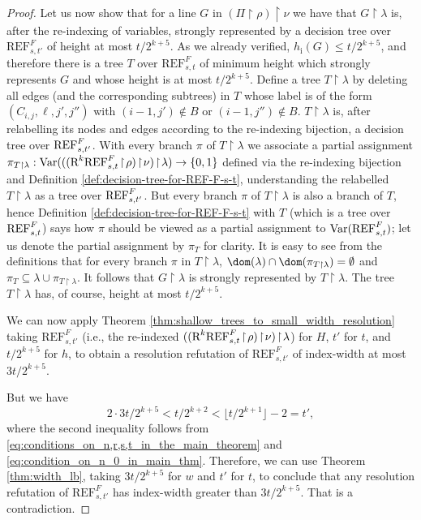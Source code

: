 \begin{proof}
Let us now show that for a line $G$ in $(\Pi \! \restriction \! \rho) \! \restriction \! \nu$ we have that $G \! \restriction \! \lambda$ is, after the re-indexing of variables, strongly represented by a decision tree over $\text{REF}^F_{s,t'}$ of height at most $t/2^{k+5}$. As we already verified, $h_{\text{i}}(G) \leq t/2^{k+5}$, and therefore there is a tree $T$ over $\text{REF}^F_{s,t}$ of minimum height which strongly represents $G$ and whose height is at most $t/2^{k+5}$. Define a tree $T \! \restriction \! \lambda$ by deleting all edges (and the corresponding subtrees) in $T$ whose label is of the form $(C_{i,j}, \ell, j', j'')$ with $(i-1,j') \notin B$ or $(i-1,j'') \notin B$. $T \! \restriction \! \lambda$ is, after relabelling its nodes and edges according to the re-indexing bijection, a decision tree over $\textnormal{REF}^{F}_{s,t'}$. With every branch $\pi$ of $T \! \restriction \! \lambda$ we associate a partial assignment $\pi_{T \restriction \lambda}: \text{Var}(((\textnormal{R}^k\textnormal{REF}^{F}_{s,t} \! \restriction \! \rho) \! \restriction \! \nu) \! \restriction \! \lambda) \rightarrow \{0,1\}$ defined via the re-indexing bijection and Definition \ref{def:decision-tree-for-REF-F-s-t}, understanding the relabelled $T \! \restriction \! \lambda$ as a tree over $\textnormal{REF}^{F}_{s,t'}$. But every branch $\pi$ of $T \! \restriction \! \lambda$ is also a branch of $T$, hence Definition \ref{def:decision-tree-for-REF-F-s-t} with $T$ (which is a tree over $\textnormal{REF}^{F}_{s,t}$) says how $\pi$ should be viewed as a partial assignment to $\text{Var}(\textnormal{REF}^{F}_{s,t})$; let us denote the partial assignment by $\pi_T$ for clarity. It is easy to see from the definitions that for every branch $\pi$ in $T \! \restriction \! \lambda$, $\dom(\lambda) \cap \dom(\pi_{T \restriction \lambda}) = \emptyset$ and $\pi_T \subseteq \lambda \cup \pi_{T \restriction \lambda}$. It follows that $G \! \restriction \! \lambda$ is strongly represented by $T \! \restriction \! \lambda$. The tree $T \! \restriction \! \lambda$ has, of course, height at most $t/2^{k+5}$. 

We can now apply Theorem \ref{thm:shallow_trees_to_small_width_resolution} taking $\text{REF}^F_{s,t'}$ (i.e., the re-indexed $((\textnormal{R}^k\textnormal{REF}^{F}_{s,t} \! \restriction \! \rho) \! \restriction \! \nu) \! \restriction \! \lambda$) for $H$, $t'$ for $t$, and $t/2^{k+5}$ for $h$, to obtain a resolution refutation of $\text{REF}^F_{s,t'}$ of index-width at most $3t/2^{k+5}$. 

But we have 
\begin{equation*}
2 \cdot 3t/2^{k+5} < t/2^{k+2} <  \lfloor t/2^{k+1} \rfloor - 2 = t',
\end{equation*}
where the second inequality follows from \ref{eq:conditions_on_n,r,s,t_in_the_main_theorem} and \ref{eq:condition_on_n_0_in_main_thm}. Therefore, we can use Theorem \ref{thm:width_lb}, taking $3t/2^{k+5}$ for $w$ and $t'$ for $t$, to conclude that any resolution refutation of $\text{REF}^F_{s,t'}$ has index-width greater than $3t/2^{k+5}$. That is a contradiction.
\end{proof}




